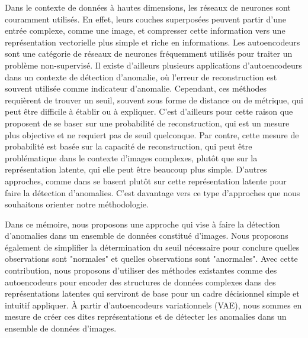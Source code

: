 Dans le contexte de données à hautes dimensions, les réseaux de neurones sont couramment utilisés. En effet, leurs couches superposées peuvent partir d'une entrée complexe, comme une image, et compresser cette information vers une représentation vectorielle plus simple et riche en informations. Les autoencodeurs sont une catégorie de réseaux de neurones fréquemment utilisés pour traiter un problème non-supervisé. Il existe d'ailleurs plusieurs applications d'autoencodeurs dans un contexte de détection d'anomalie, où l'erreur de reconstruction est souvent utilisée comme indicateur d'anomalie. Cependant, ces méthodes requièrent de trouver un seuil, souvent sous forme de distance ou de métrique, qui peut être difficile à établir ou à expliquer. C'est d'ailleurs pour cette raison que  \cite{An2015VariationalAB} proposent de se baser sur une probabilité de reconstruction, qui est un mesure plus objective et ne requiert pas de seuil quelconque. Par contre, cette mesure de probabilité est basée sur la capacité de reconstruction, qui peut être problématique dans le contexte d'images complexes, plutôt que sur la représentation latente, qui elle peut être beaucoup plus simple. D'autres approches, comme dans \cite{DBLP:journals/corr/abs-1802-06360} se basent plutôt sur cette représentation latente pour faire la détection d'anomalies. C'est davantage vers ce type d'approches que nous souhaitons orienter notre méthodologie. 

Dans ce mémoire, nous proposons une approche qui vise à faire la détection d'anomalies dans un ensemble de données constitué d'images. Nous proposons également de simplifier la détermination du seuil nécessaire pour conclure quelles observations sont "normales" et quelles observations sont "anormales". Avec cette contribution, nous proposons d'utiliser des méthodes existantes comme des autoencodeurs  pour encoder des structures de données complexes dans des représentations latentes qui serviront de base pour un cadre décisionnel simple et intuitif appliquer. À partir d'autoencodeurs variationnels (VAE), nous sommes en mesure de créer ces dites représentations et de détecter les anomalies dans un ensemble de données d'images.